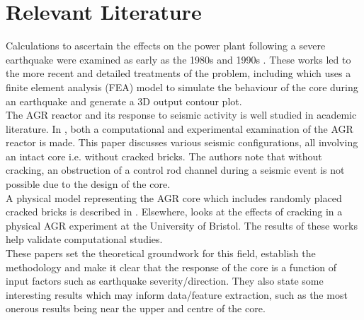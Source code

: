 \section{Relevant Literature} \label{engineering:literature}

Calculations to ascertain the effects on the power plant following a severe earthquake were examined as early as the 1980s \cite{ahmed1986seismic} and 1990s \cite{allen1990seismic}. These works led to the more recent and detailed treatments of the problem, including \cite{kralj2007seismic} which uses a finite element analysis (FEA) model \cite{zienkiewicz2005finite} to simulate the behaviour of the core during an earthquake and generate a 3D output contour plot. \\

\noindent
The AGR reactor and its response to seismic activity is well studied in academic literature. In \cite{voyagaki2018earthquake}, both a computational and experimental examination of the AGR reactor is made. This paper discusses various seismic configurations, all involving an intact core i.e. without cracked bricks. The authors note that without cracking, an obstruction of a control rod channel during a seismic event is not possible due to the design of the core. \\

\noindent
A physical model representing the AGR core which includes randomly placed cracked bricks is described in \cite{dihoru2017development}. Elsewhere, \cite{oddbjornsson2017physical} looks at the effects of cracking in a physical AGR experiment at the University of Bristol. The results of these works help validate computational studies.\\ 

\noindent
These papers set the theoretical groundwork for this field, establish the methodology and make it clear that the response of the core is a function of input factors such as earthquake severity/direction. They also state some interesting results which may inform data/feature extraction, such as the most onerous results being near the upper and centre of the core.

